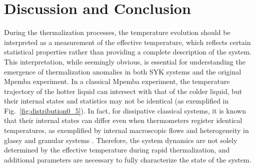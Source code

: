 \documentclass[prl,superscriptaddress,notitlepage,showpacs,twocolumn]{revtex4-2}
\begin{document}
\section{Discussion and Conclusion}
During the thermalization processes, the temperature evolution should be interpreted as a measurement of the effective temperature, which reflects certain statistical properties rather than providing a complete description of the system. This interpretation, while seemingly obvious, is essential for understanding the emergence of thermalization anomalies in both SYK systems and the original Mpemba experiment. In a classical Mpemba experiment, the temperature trajectory of the hotter liquid can intersect with that of the colder liquid, but their internal states and statistics may not be identical (as exemplified in Fig.~\ref{fig:distribution0_5}). In fact, for dissipative classical systems, it is known that their internal states can differ even when thermometers register identical temperatures, as exemplified by internal macroscopic flows and heterogeneity in glassy and granular systems \cite{j2007statistical,ritort2003glassy,ediger2000spatially,yamamoto1998dynamics}. Therefore, the system dynamics are not solely determined by the effective temperature during rapid thermalization, and additional parameters are necessary to fully characterize the state of the system. %
\end{document}
